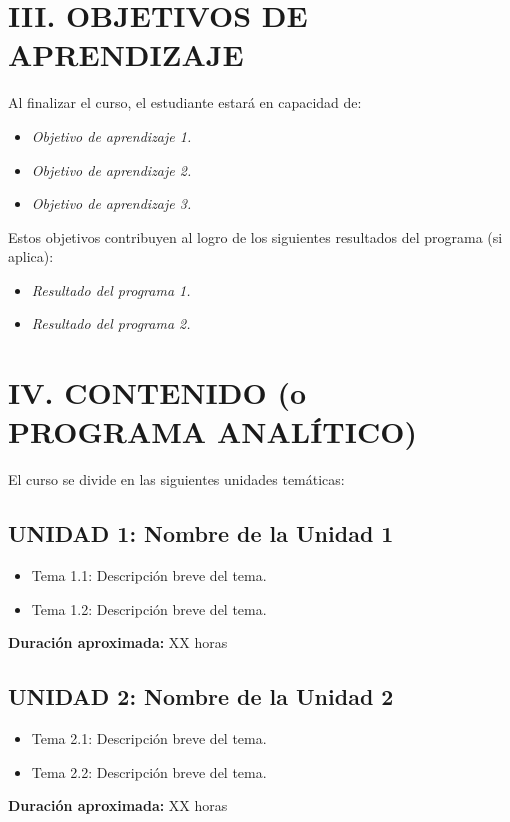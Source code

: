 \documentclass[12pt,a4paper]{article}
\begin{document}
\section*{III. OBJETIVOS DE APRENDIZAJE} %
Al finalizar el curso, el estudiante estará en capacidad de:
\begin{itemize}[leftmargin=*]
    \item \textit{Objetivo de aprendizaje 1.}
    \item \textit{Objetivo de aprendizaje 2.}
    \item \textit{Objetivo de aprendizaje 3.}
\end{itemize}
Estos objetivos contribuyen al logro de los siguientes resultados del programa (si aplica):
\begin{itemize}[leftmargin=*]
    \item \textit{Resultado del programa 1.}
    \item \textit{Resultado del programa 2.}
\end{itemize}
\vspace{0.5cm}

\section*{IV. CONTENIDO (o PROGRAMA ANALÍTICO)}
El curso se divide en las siguientes unidades temáticas:

\subsection*{UNIDAD 1: Nombre de la Unidad 1}
\begin{itemize}[leftmargin=*]
    \item Tema 1.1: Descripción breve del tema.
    \item Tema 1.2: Descripción breve del tema.
\end{itemize}
\textbf{Duración aproximada:} XX horas

\subsection*{UNIDAD 2: Nombre de la Unidad 2}
\begin{itemize}[leftmargin=*]
    \item Tema 2.1: Descripción breve del tema.
    \item Tema 2.2: Descripción breve del tema.
\end{itemize}
\textbf{Duración aproximada:} XX horas
\end{document}
